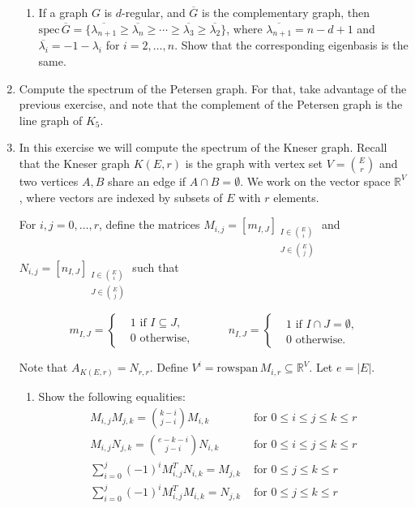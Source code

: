 \documentclass[kulak]{tplt}
\theoremstyle{definition}
\newcommand{\R}{\mathbb{R}}
\newcommand{\rowspn}{\mathrm{rowspan}}
\newcommand{\spec}{\mathrm{spec}}
\begin{document}
\begin{enumerate}
\begin{enumerate}
\item If a graph $G$ is $d$-regular, and $\overline{G}$ is the complementary graph, then $\spec \, \overline{G} = \{ \overline{\lambda_{n+1}} \geq  \overline{\lambda_{n}} \geq  \cdots \geq  \overline{\lambda_{3}} \geq  \overline{\lambda_{2}} \}$, where $\overline{\lambda_{n+1}} = n - d + 1$ and $\overline{\lambda_i} = - 1 - \lambda _ i$ for $i = 2, \ldots, n$.
Show that the corresponding eigenbasis is the same.
\end{enumerate}


\item Compute the spectrum of the Petersen graph.
For that, take advantage of the previous exercise, and note that the complement of the Petersen graph is the line graph of $K_5$.

\item In this exercise we will compute the spectrum of the Kneser graph.
Recall that the Kneser graph $K(E, r)$ is the graph with vertex set $V = \binom{E}{r}$ and two vertices $A, B$ share an edge if $A \cap B = \emptyset$.
We work on the vector space $\R^V$, where vectors are indexed by subsets of $E$ with $r$ elements.

For $i, j = 0, \ldots, r$, define the matrices $M_{i, j} = [m_{I, J}]_{\substack{I\in \binom{E}{i} \\ J \in \binom{E}{j}}}$ and $N_{i, j} = [n_{I, J}]_{\substack{I\in \binom{E}{i} \\ J \in \binom{E}{j}}}$ such that 

$$ m_{I, J} =\begin{cases*}
      & 1 \text{ if $I \subseteq J$,}\\
      & 0 \text{ otherwise,}
    \end{cases*}  \quad \quad \quad 
     n_{I, J} =\begin{cases*}
      & 1 \text{ if $I \cap J = \emptyset $,}\\
      & 0 \text{ otherwise.}
    \end{cases*}  $$

Note that $A_{K(E, r)} = N_{r, r}$.
Define $V^i = \rowspn \, M_{i, r} \subseteq \R^V$.
Let $e = |E|$.

\begin{enumerate}
\item
Show the following equalities:
\begin{equation}\label{eq:matrices}
\begin{split}
M_{i, j} M_{j, k} = \binom{k-i}{j-i} M_{i, k} &\text{ for $0\leq i \leq j \leq k \leq r$}\\
M_{i, j} N_{j, k} = \binom{e-k-i}{j-i} N_{i, k}  &\text{ for $0\leq i \leq j \leq k \leq r$}\\
\sum_{i=0}^j (-1)^i M_{i, j}^T N_{i, k} = M_{j, k} &\text{ for $0\leq j \leq k \leq r$}\\
\sum_{i=0}^j (-1)^i M_{i, j}^T M_{i, k} = N_{j, k} &\text{ for $0\leq j \leq k \leq r$}\\
\end{split}
\end{equation}


\end{enumerate}
\end{enumerate}
\end{document}
